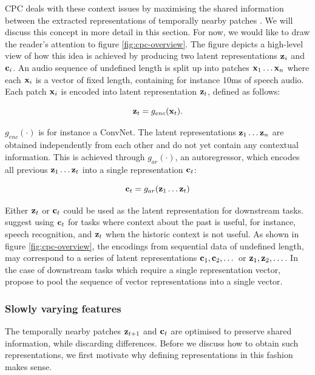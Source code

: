	CPC deals with these context issues by maximising the shared information between the extracted representations of temporally nearby patches \citep{lowePuttingEndEndtoEnd2020a}. We will discuss this concept in more detail in this section. For now, we would like to draw the reader's attention to figure \ref{fig:cpc-overview}. The figure depicts a high-level view of how this idea is achieved by producing two latent representations $\mathbf{z}_i$ and $\mathbf{c}_i$. An audio sequence of undefined length is split up into patches $\mathbf{x}_1 \dots \mathbf{x}_n$ where each $\mathbf{x}_i$ is a vector of fixed length, containing for instance 10ms of speech audio. Each patch $\mathbf{x}_i$ is encoded into latent representation $\mathbf{z}_t$, defined as follows:
	
	$$
	\mathbf{z}_t = g_{enc}(\mathbf{x}_t) .
	$$
	
	$g_{enc}( \cdot )$ is for instance a ConvNet. The latent representations $\mathbf{z}_1 \dots \mathbf{z}_n$ are obtained independently from each other and do not yet contain any contextual information. This is achieved through $g_{ar}( \cdot )$, an autoregressor, which encodes all previous $\mathbf{z}_1 \dots \mathbf{z}_t$ into a single representation $\mathbf{c}_t$:
	
	$$
	\mathbf{c}_t = g_{ar}(\mathbf{z}_1 \dots \mathbf{z}_t)
	$$
	
	Either $\mathbf{z}_t$ or $\mathbf{c}_t$ could be used as the latent representation for downstream tasks. \cite{oordRepresentationLearningContrastive2019} suggest using $\mathbf{c}_t$ for tasks where context about the past is useful, for instance, speech recognition, and $\mathbf{z}_t$ when the historic context is not useful. As shown in figure \ref{fig:cpc-overview}, the encodings from sequential data of undefined length, may correspond to a series of latent representations $\mathbf{c}_1, \mathbf{c}_2, \dots $ or $\mathbf{z}_1, \mathbf{z}_2, \dots $. In the case of downstream tasks which require a single representation vector, \citeauthor{oordRepresentationLearningContrastive2019} propose to pool the sequence of vector representations into a single vector.
	

\subsubsection{Slowly varying features}
	The temporally nearby patches $\mathbf{z}_{t+1}$ and $\mathbf{c}_t$ are optimised to preserve shared information, while discarding differences. Before we discuss how to obtain such representations, we first motivate why defining representations in this fashion makes sense.
	
